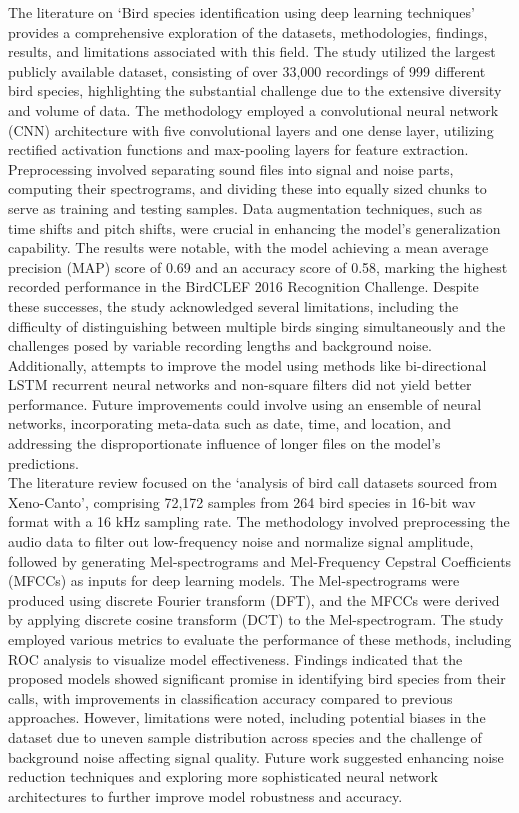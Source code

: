 The literature on `Bird species identification using deep learning techniques' provides a comprehensive exploration of the datasets, methodologies, findings, results, and limitations associated with this field. The study utilized the largest publicly available dataset, consisting of over 33,000 recordings of 999 different bird species, highlighting the substantial challenge due to the extensive diversity and volume of data. The methodology employed a convolutional neural network (CNN) architecture with five convolutional layers and one dense layer, utilizing rectified activation functions and max-pooling layers for feature extraction. Preprocessing involved separating sound files into signal and noise parts, computing their spectrograms, and dividing these into equally sized chunks to serve as training and testing samples. Data augmentation techniques, such as time shifts and pitch shifts, were crucial in enhancing the model's generalization capability. The results were notable, with the model achieving a mean average precision (MAP) score of 0.69 and an accuracy score of 0.58, marking the highest recorded performance in the BirdCLEF 2016 Recognition Challenge. Despite these successes, the study acknowledged several limitations, including the difficulty of distinguishing between multiple birds singing simultaneously and the challenges posed by variable recording lengths and background noise. Additionally, attempts to improve the model using methods like bi-directional LSTM recurrent neural networks and non-square filters did not yield better performance. Future improvements could involve using an ensemble of neural networks, incorporating meta-data such as date, time, and location, and addressing the disproportionate influence of longer files on the model's predictions.\\

The literature review focused on the `analysis of bird call datasets sourced from Xeno-Canto', comprising 72,172 samples from 264 bird species in 16-bit wav format with a 16 kHz sampling rate. The methodology involved preprocessing the audio data to filter out low-frequency noise and normalize signal amplitude, followed by generating Mel-spectrograms and Mel-Frequency Cepstral Coefficients (MFCCs) as inputs for deep learning models. The Mel-spectrograms were produced using discrete Fourier transform (DFT), and the MFCCs were derived by applying discrete cosine transform (DCT) to the Mel-spectrogram. The study employed various metrics to evaluate the performance of these methods, including ROC analysis to visualize model effectiveness. Findings indicated that the proposed models showed significant promise in identifying bird species from their calls, with improvements in classification accuracy compared to previous approaches. However, limitations were noted, including potential biases in the dataset due to uneven sample distribution across species and the challenge of background noise affecting signal quality. Future work suggested enhancing noise reduction techniques and exploring more sophisticated neural network architectures to further improve model robustness and accuracy.\\

